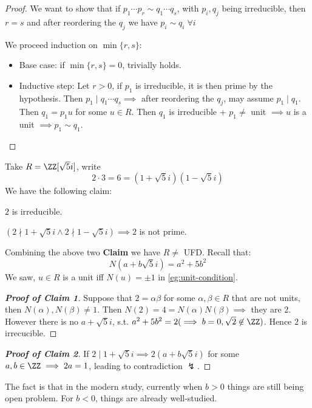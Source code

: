 \begin{proof}
	We want to show that if \( p_1 \cdots p_r \sim q_1 \cdots q_s \), with \( p_i, q_j \) being
	irreducible, then \( r=s \) and after reordering the \( q_j \) we have \( p_i \sim q_i \; \forall
	i\)

	We proceed induction on \( \min\{r,s\} \):
	\begin{itemize}
		\item Base case: if \( \min\{r,s\}=0 \), trivially holds.
		\item Inductive step: Let \( r>0 \), if \( p_1 \) is irreducible, it is then prime by the
		      hypothesis. Then \( p_1 \mid q_1\cdots q_s \implies \) after reordering the \( q_j \), may
		      assume \( p_1 \mid q_1 \). Then \( q_1 = p_1 u \) for some \( u\in R \). Then \( q_1 \) is
		      irreducible + \( p_1 \ne \) unit \( \implies u \) is a unit \( \implies p_1\sim q_1\).
	\end{itemize}
\end{proof}

\begin{eg}
	Take \( R = \ZZ[\sqrt{5} i] \), write
	\[ 2\cdot 3 = 6 = (1+\sqrt{5}i)(1-\sqrt{5}i) \]
	We have the following claim:
	\begin{claim}
		\( 2 \) is irreducible.
	\end{claim}
	\begin{claim}
		\( (2\nmid 1+\sqrt{5}i \land 2 \nmid 1-\sqrt{5}i) \implies 2 \) is not prime.
	\end{claim}
	Combining the above two \textbf{Claim} we
	have \( R \ne \) UFD. Recall that:
	\[
		N(a+b\sqrt{5}i) = a^2 + 5b^2
	\]
	We saw, \( u\in R \) is a unit iff \( N(u) = \pm 1 \) in \ref{eg:unit-condition}.
	\begin{proof}[\textbf{Proof of Claim 1}]
		Suppose that \( 2 = \alpha \beta \) for some \( \alpha, \beta \in R \) that are not units, then
		\( N(\alpha), N(\beta) \ne 1 \). Then \( N(2) = 4 = N(\alpha)N(\beta) \implies \) they are
		\( 2 \). However there is no \( a+\sqrt{5}i \), s.t. \( a^2 + 5b^2 = 2 (\implies b=0, \sqrt{2}
		\not\in \ZZ) \). Hence \( 2 \) is irrecucible.
	\end{proof}

	\begin{proof}[\textbf{Proof of Claim 2}]
		If \( 2 \mid 1+\sqrt{5}i \implies 2(a+b\sqrt{5}i) \) for some \( a,b\in \ZZ \implies 2a = 1\),
		leading to contradiction \( \lightning \).
	\end{proof}
	The fact is that in the modern study, currently when \( b >0 \) things are still being open
	problem. For \( b<0 \), things are already well-studied.
\end{eg}

